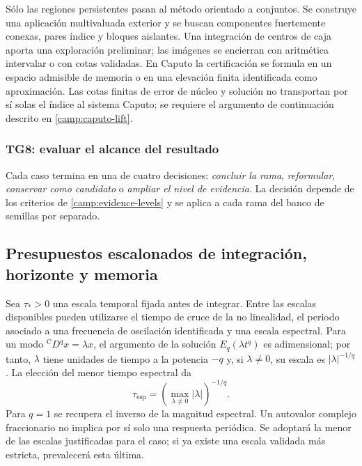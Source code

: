Sólo las regiones persistentes pasan al método orientado a conjuntos. Se
construye una aplicación multivaluada exterior y se buscan componentes
fuertemente conexas, pares índice y bloques aislantes. Una integración de
centros de caja aporta una exploración preliminar; las imágenes se encierran con aritmética
intervalar o con cotas validadas. En Caputo la certificación se formula en un
espacio admisible de memoria o en una elevación finita identificada como
aproximación. Las cotas finitas de error de núcleo y solución no transportan
por sí solas el índice al sistema Caputo; se requiere el argumento de
continuación descrito en \cref{camp:caputo-lift}.

\subsubsection*{TG8: evaluar el alcance del resultado}

Cada caso termina en una de cuatro decisiones: \emph{concluir la rama},
\emph{reformular}, \emph{conservar como candidato} o \emph{ampliar el nivel de evidencia}. La decisión depende de los criterios de \cref{camp:evidence-levels} y se aplica
a cada rama del banco de semillas por separado.

\subsection{Presupuestos escalonados de integración, horizonte y memoria}
\label{camp:budgets}

Sea \(\tau_*>0\) una escala temporal fijada antes de integrar. Entre las
escalas disponibles pueden utilizarse el tiempo de cruce de la no linealidad,
el periodo asociado a una frecuencia de oscilación identificada y una escala
espectral. Para un modo \({}^{\mathrm C}D^q x=\lambda x\), el argumento de la
solución \(E_q(\lambda t^q)\) es adimensional; por tanto, \(\lambda\) tiene
unidades de tiempo a la potencia \(-q\) y, si \(\lambda\ne0\), su escala es
\(|\lambda|^{-1/q}\). La elección del menor tiempo espectral da
\[
 \tau_{\mathrm{esp}}=
 \left(\max_{\lambda\ne0}|\lambda|\right)^{-1/q}.
\]
Para \(q=1\) se recupera el inverso de la magnitud espectral. Un autovalor
complejo fraccionario no implica por sí solo una respuesta periódica. Se
adoptará la menor de las escalas justificadas para el caso; si ya existe una
escala validada más estricta, prevalecerá esta última.

